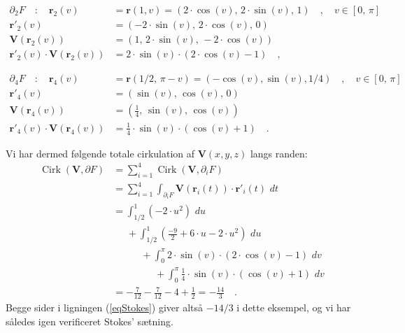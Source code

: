 \begin{example}
\begin{equation}
\begin{aligned}
\partial_{2} F \quad : \quad \mathbf{r}_{2}(v) &= \mathbf{r}(1, v) = (2\cdot \cos(v), \, 2\cdot \sin(v), \, 1) \quad , \quad  v \in [0, \, \pi] \\
\mathbf{r}'_{2}(v) &= (-2\cdot \sin(v), \, 2 \cdot \cos(v), \, 0) \\
\mathbf{V}(\mathbf{r}_{2}(v)) &= (1, \, 2\cdot \sin(v), \, -2\cdot \cos(v)) \\
\mathbf{r}'_{2}(v)\cdot \mathbf{V}(\mathbf{r}_{2}(v)) &= 2\cdot \sin(v)\cdot  \left(2\cdot \cos(v) -1 \right) \quad , \end{aligned}
\end{equation}

\begin{equation}
\begin{aligned}
\partial_{4} F \quad : \quad \mathbf{r}_{4}(v) &= \mathbf{r}(1/2, \, \pi - v) = (-\cos(v), \sin(v), 1/4) \quad , \quad  v \in [0, \, \pi] \\
\mathbf{r}'_{4}(v) &= (\sin(v), \, \cos(v) , \, 0) \\
\mathbf{V}(\mathbf{r}_{4}(v)) &= (\frac{1}{4}, \, \sin(v), \, \cos(v))  \\
\mathbf{r}'_{4}(v)\cdot \mathbf{V}(\mathbf{r}_{4}(v)) &= \frac{1}{4}\cdot \sin(v)\cdot  \left(\cos(v) +1 \right)  \quad .
\end{aligned}
\end{equation}

Vi har dermed følgende totale cirkulation af $\mathbf{V}(x,y,z)$ langs randen:
\begin{equation}
\begin{aligned}
\operatorname{Cirk}(\mathbf{V}, \partial F) &= \sum_{i=1}^{4} \operatorname{Cirk}(\mathbf{V}, \partial_{i} F) \\
&= \sum_{i=1}^{4} \int_{\partial_{i} F} \mathbf{V}(\mathbf{r}_{i}(t))\cdot \mathbf{r}'_{i}(t) \, \, dt \\
&= \int_{1/2}^{1} \left(-2\cdot u^{2}\right) \,\, du \\
&\phantom{abc}+ \int_{1/2}^{1} \left(\frac{-9}{2} + 6\cdot u - 2\cdot u^{2}\right) \,\, du \\
&\phantom{abcdef}+ \int_{0}^{\pi} 2\cdot \sin(v)\cdot  \left(2\cdot \cos(v) -1 \right) \,\, dv \\
&\phantom{abcdefghi}+ \int_{0}^{\pi} \frac{1}{4}\cdot \sin(v)\cdot  \left(\cos(v) +1 \right)\,\, dv \\
&= - \frac{7}{12} -  \frac{7}{12} - 4 + \frac{1}{2} = - \frac{14}{3} \quad .
\end{aligned}
\end{equation}
Begge sider i ligningen (\ref{eqStokes}) giver altså $-14/3$ i dette eksempel, og vi har således igen verificeret Stokes' sætning.
\end{example}



